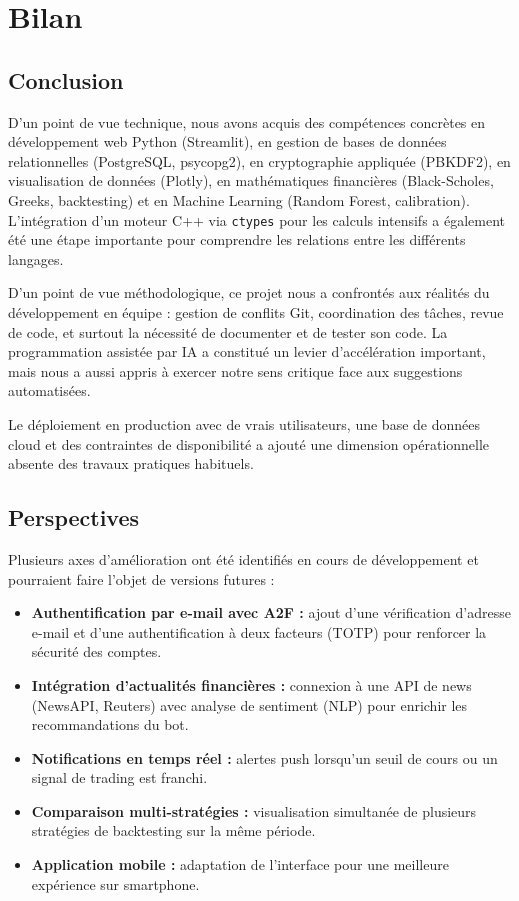 \documentclass[a4paper, 12pt, twoside]{article}
\begin{document}
\section{Bilan}

\subsection{Conclusion}

D'un point de vue technique, nous avons acquis des compétences concrètes
en développement web Python (Streamlit), en gestion de bases de données
relationnelles (PostgreSQL, psycopg2), en cryptographie appliquée
(PBKDF2), en visualisation de données (Plotly), en mathématiques
financières (Black-Scholes, Greeks, backtesting) et en Machine Learning
(Random Forest, calibration). L'intégration d'un moteur C++ via
\texttt{ctypes} pour les calculs intensifs a également été une étape
importante pour comprendre les relations entre les différents langages.

D'un point de vue méthodologique, ce projet nous a confrontés aux
réalités du développement en équipe : gestion de conflits Git,
coordination des tâches, revue de code, et surtout la nécessité de
documenter et de tester son code. La programmation assistée par IA a
constitué un levier d'accélération important, mais nous a aussi appris à
exercer notre sens critique face aux suggestions automatisées.

Le déploiement en production avec de vrais utilisateurs, une base de
données cloud et des contraintes de disponibilité a ajouté une dimension
opérationnelle absente des travaux pratiques habituels.

\subsection{Perspectives}

Plusieurs axes d'amélioration ont été identifiés en cours de
développement et pourraient faire l'objet de versions futures :

\begin{itemize}
    \item \textbf{Authentification par e-mail avec A2F :} ajout d'une
          vérification d'adresse e-mail et d'une authentification à deux
          facteurs (TOTP) pour renforcer la sécurité des comptes.
    \item \textbf{Intégration d'actualités financières :} connexion à une
          API de news (NewsAPI, Reuters) avec analyse de sentiment (NLP)
          pour enrichir les recommandations du bot.
    \item \textbf{Notifications en temps réel :} alertes push lorsqu'un
          seuil de cours ou un signal de trading est franchi.
    \item \textbf{Comparaison multi-stratégies :} visualisation
          simultanée de plusieurs stratégies de backtesting sur la même
          période.
    \item \textbf{Application mobile :} adaptation de l'interface pour
          une meilleure expérience sur smartphone.
\end{itemize}
\end{document}
